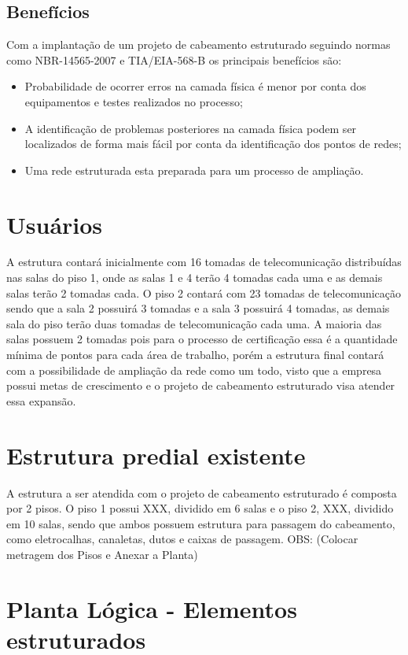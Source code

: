 \documentclass[	DIV=calc,%
							paper=a4,%
							fontsize=12pt,%
							onecolumn]{scrartcl}	 					%
\begin{document}
\subsection{Benefícios}
Com a implantação de um projeto de cabeamento estruturado seguindo normas como NBR-14565-2007 e TIA/EIA-568-B os principais benefícios são:
\begin{itemize}
\item Probabilidade de ocorrer erros na camada física é menor por conta dos equipamentos e testes realizados no processo;
\item A identificação de problemas posteriores na camada física podem ser localizados de forma mais fácil por conta da identificação dos pontos de redes;
\item Uma rede estruturada esta preparada para um processo de ampliação. 
\end{itemize}

\section{Usuários}
A estrutura contará inicialmente com 16 tomadas de telecomunicação distribuídas nas salas do piso 1, onde as salas 1 e 4 terão 4 tomadas cada uma e as demais salas terão 2 tomadas cada.
O piso 2 contará com 23 tomadas de telecomunicação sendo que a sala 2 possuirá 3 tomadas e a sala 3 possuirá 4 tomadas, as demais sala do piso terão duas tomadas de telecomunicação cada uma.
A maioria das salas possuem 2 tomadas pois para o processo de certificação essa é a quantidade mínima de pontos para cada área de trabalho, porém a estrutura final contará com a possibilidade de ampliação da rede como um todo, visto que a empresa possui metas de crescimento e o projeto de cabeamento estruturado visa atender essa expansão.


\section{Estrutura predial existente}
A estrutura a ser atendida com o projeto de cabeamento estruturado é composta por 2 pisos. O piso 1 possui XXX, dividido em 6 salas e o piso 2, XXX, dividido em 10 salas, sendo que ambos possuem estrutura para passagem do cabeamento, como eletrocalhas, canaletas, dutos e caixas de passagem.    
OBS: (Colocar metragem dos Pisos e Anexar a Planta)


\section{Planta Lógica - Elementos estruturados}
\end{document}
